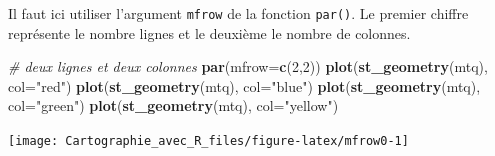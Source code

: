 \documentclass[]{book}
\newenvironment{Shaded}{\begin{snugshade}}{\end{snugshade}}
\newcommand{\KeywordTok}[1]{\textcolor[rgb]{0.13,0.29,0.53}{\textbf{#1}}}
\newcommand{\DataTypeTok}[1]{\textcolor[rgb]{0.13,0.29,0.53}{#1}}
\newcommand{\DecValTok}[1]{\textcolor[rgb]{0.00,0.00,0.81}{#1}}
\newcommand{\StringTok}[1]{\textcolor[rgb]{0.31,0.60,0.02}{#1}}
\newcommand{\CommentTok}[1]{\textcolor[rgb]{0.56,0.35,0.01}{\textit{#1}}}
\newcommand{\NormalTok}[1]{#1}
\begin{document}
Il faut ici utiliser l'argument \texttt{mfrow} de la fonction
\texttt{par()}. Le premier chiffre représente le nombre lignes et le
deuxième le nombre de colonnes.

\begin{Shaded}
\begin{Highlighting}[]
\CommentTok{# deux lignes et deux colonnes}
\KeywordTok{par}\NormalTok{(}\DataTypeTok{mfrow=}\KeywordTok{c}\NormalTok{(}\DecValTok{2}\NormalTok{,}\DecValTok{2}\NormalTok{))}
\KeywordTok{plot}\NormalTok{(}\KeywordTok{st_geometry}\NormalTok{(mtq), }\DataTypeTok{col=}\StringTok{"red"}\NormalTok{)}
\KeywordTok{plot}\NormalTok{(}\KeywordTok{st_geometry}\NormalTok{(mtq), }\DataTypeTok{col=}\StringTok{"blue"}\NormalTok{)}
\KeywordTok{plot}\NormalTok{(}\KeywordTok{st_geometry}\NormalTok{(mtq), }\DataTypeTok{col=}\StringTok{"green"}\NormalTok{)}
\KeywordTok{plot}\NormalTok{(}\KeywordTok{st_geometry}\NormalTok{(mtq), }\DataTypeTok{col=}\StringTok{"yellow"}\NormalTok{)}
\end{Highlighting}
\end{Shaded}

\begin{center}\texttt{[image: Cartographie\_avec\_R\_files/figure-latex/mfrow0-1]} \end{center}
\end{document}
